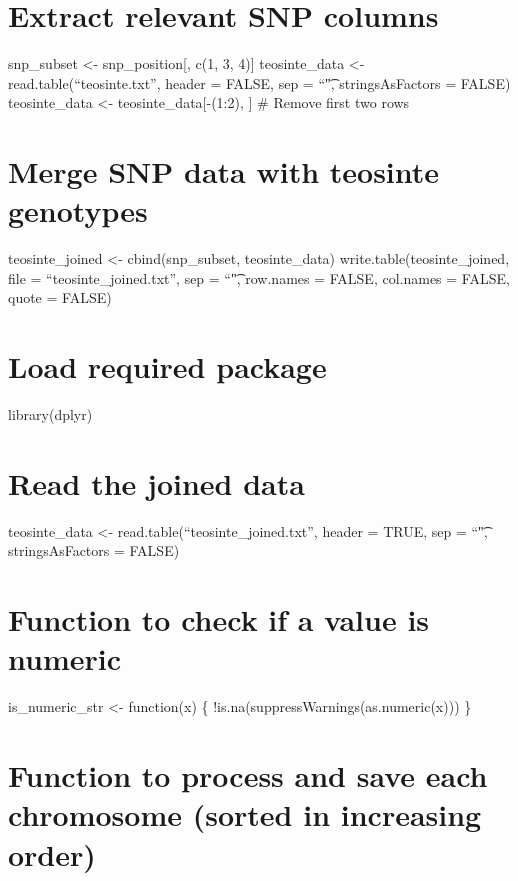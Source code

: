 \documentclass[
]{article}
\begin{document}
\section{Extract relevant SNP
columns}\label{extract-relevant-snp-columns-1}

snp\_subset \textless- snp\_position{[}, c(1, 3, 4){]} teosinte\_data
\textless- read.table(``teosinte.txt'', header = FALSE, sep = ``\t",
stringsAsFactors = FALSE) teosinte\_data \textless-
teosinte\_data{[}-(1:2), {]} \# Remove first two rows

\section{Merge SNP data with teosinte
genotypes}\label{merge-snp-data-with-teosinte-genotypes}

teosinte\_joined \textless- cbind(snp\_subset, teosinte\_data)
write.table(teosinte\_joined, file = ``teosinte\_joined.txt'', sep =
``\t", row.names = FALSE, col.names = FALSE, quote = FALSE)

\section{Load required package}\label{load-required-package-1}

library(dplyr)

\section{Read the joined data}\label{read-the-joined-data-1}

teosinte\_data \textless- read.table(``teosinte\_joined.txt'', header =
TRUE, sep = ``\t", stringsAsFactors = FALSE)

\section{Function to check if a value is
numeric}\label{function-to-check-if-a-value-is-numeric-1}

is\_numeric\_str \textless- function(x) \{
!is.na(suppressWarnings(as.numeric(x))) \}

\section{Function to process and save each chromosome (sorted in
increasing
order)}\label{function-to-process-and-save-each-chromosome-sorted-in-increasing-order-1}
\end{document}

